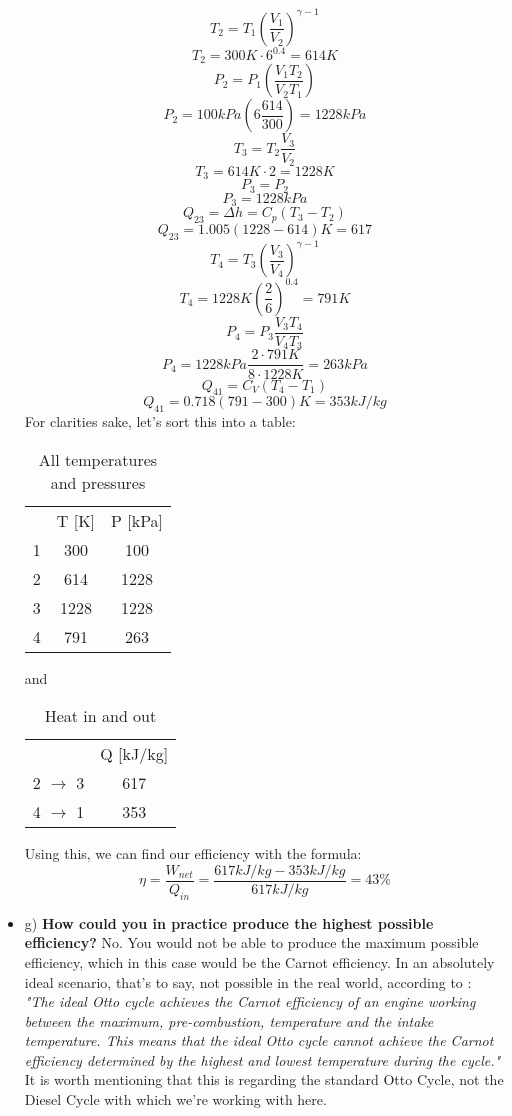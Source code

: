 \documentclass{article}
\begin{document}
\begin{itemize}
   $$T_2 = T_1\left(\frac{V_1}{V_2}\right)^{\gamma-1}$$
   $$T_2 = 300K \cdot 6^{0.4} = 614K$$
   $$P_2 = P_1 \left(\frac{V_1 T_2}{V_2 T_1}\right)$$
   $$P_2 = 100 kPa \left( 6\frac{614}{300} \right) = 1228 kPa$$
   $$T_3 = T_2 \frac{V_3}{V_2}$$
   $$T_3 = 614K \cdot 2 = 1228K$$
   $$P_3 = P_2 $$
   $$P_3 = 1228 kPa$$
   $$Q_{23} = \Delta h = C_p (T_3 - T_2)$$
   $$Q_{23} = 1.005(1228-614)K = 617$$
   $$T_4 = T_3 \left( \frac{V_3}{V_4}\right)^{\gamma-1}$$
   $$T_4 = 1228K \left( \frac{2}{6} \right)^{0.4} = 791 K$$
   $$P_4 = P_3 \frac{V_3 T_4}{V_4 T_3}$$
   $$P_4 = 1228 kPa \frac{2\cdot 791 K}{8\cdot 1228 K} = 263 kPa$$
    $$Q_{41} = C_V(T_4-T_1)$$
    $$Q_{41} = 0.718(791-300)K = 353 kJ/kg $$
    \newpage
    For clarities sake, let's sort this into a table:
    \begin{table}[ht!]
        \centering
        \begin{tabular}{c|c|c}
             &T [K]& P [kPa]  \\
            1& 300& 100 \\
            2& 614& 1228 \\
            3& 1228&  1228 \\
            4& 791& 263&
        \end{tabular}
        \caption{All temperatures and pressures}
        \label{tab:1}
    \end{table}
    \newline and
    \begin{table}[ht!]
        \centering
        \begin{tabular}{c|c}
             &Q [kJ/kg]  \\
            2 $\xrightarrow{}$ 3& 617 \\
            4 $\xrightarrow{}$ 1& 353& 
        \end{tabular}
        \caption{Heat in and out}
        \label{tab:2}
    \end{table}
\newline
Using this, we can find our efficiency with the formula:
\begin{equation*}
    \eta = \frac{W_{net}}{Q_{in}} = \frac{617 kJ/kg - 353 kJ/kg}{617 kJ/kg} = 43\%
\end{equation*}
    \item g) \textbf{How could you in practice produce the highest possible efficiency?
} \newline No. You would not be able to produce the maximum possible efficiency, which in this case would be the Carnot efficiency. In an absolutely ideal scenario, that's to say, not possible in the real world, according to \cite{sourc3}: \newline \textit{"The ideal Otto cycle achieves the Carnot efficiency of an engine working between the maximum, pre-combustion, temperature and the intake temperature. This means that the ideal Otto cycle cannot achieve the Carnot efficiency determined by the highest and lowest temperature during the cycle."} \newline It is worth mentioning that this is regarding the standard Otto Cycle, not the Diesel Cycle with which we're working with here. \newline

\end{itemize}
\end{document}
